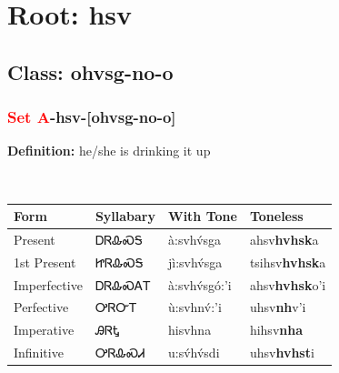 \needspace{4in}
\section*{Root: hsv}
\nopagebreak
{}
\needspace{3in}
\subsection*{Class: ohvsg-no-o}
\nopagebreak
\needspace{2in}
\subsubsection*{\textcolor{Red}{Set A}{-}\textbf{hsv}{-}[ohvsg-no-o]}
\nopagebreak
\textbf{Definition: } he/she is drinking it up
\\[0.5em]
\begin{tabularx}{\textwidth}{l X X X}%
\toprule%
\textbf{Form}&\textbf{Syllabary}&\textbf{With Tone}&\textbf{Toneless}\\%
\midrule%
Present&ᎠᏒᎲᏍᎦ&à:svhv́sga&ahsv\textbf{hvhsk}a\\%
1st Present&ᏥᏒᎲᏍᎦ&jì:svhv́sga&tsihsv\textbf{hvhsk}a\\%
Imperfective&ᎠᏒᎲᏍᎪᎢ&à:svhv́sgó:’i&ahsv\textbf{hvhsk}o'i\\%
Perfective&ᎤᏒᏅᎢ&ù:svhnv́:’i&uhsv\textbf{nh}v'i\\%
Imperative&ᎯᏒᎿ&hisvhna&hihsv\textbf{nha}\\%
Infinitive&ᎤᏒᎲᏍᏗ&u:sv́hv́sdi&uhsv\textbf{hvhst}i\\%
\bottomrule%
\end{tabularx}
\\[1em]